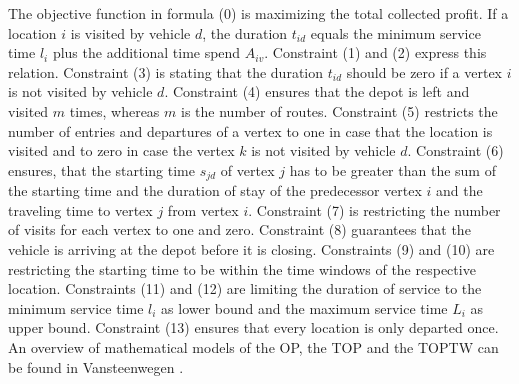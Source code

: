 \documentclass[final,5p,times,twocolumn]{elsarticle}
\begin{document}
The objective function in formula (0) is maximizing the total collected profit. If a location $i$ is visited by vehicle $d$, the duration $t_{id}$ equals the minimum service time $l_{i}$ plus the additional time spend $A_{iv}$. Constraint (1) and (2) express this relation. Constraint (3) is stating that the duration $t_{id}$ should be zero if a vertex $i$ is not visited by vehicle $d$. Constraint (4) ensures that the depot is left and visited $m$ times, whereas $m$ is the number of routes. Constraint (5) restricts the number of entries and departures of a vertex to one in case that the location is visited and to zero in case the vertex $k$ is not visited by vehicle $d$. Constraint (6) ensures, that the starting time $s_{jd}$ of vertex $j$ has to be greater than the sum of the starting time and the duration of stay of the predecessor vertex $i$ and the traveling time to vertex $j$ from vertex $i$. Constraint (7) is restricting the number of visits for each vertex to one and zero. Constraint (8) guarantees that the vehicle is arriving at the depot before it is closing. Constraints (9) and (10) are restricting the starting time to be within the time windows of the respective location. Constraints (11) and (12) are limiting the duration of service to the minimum service time $l_{i}$ as lower bound and the maximum service time $L_{i}$ as upper bound. Constraint (13) ensures that every location is only departed once.\\
An overview of mathematical models of the OP, the TOP and the TOPTW can be found in Vansteenwegen \citep{Vansteenwegen:2011op}.
\end{document}
